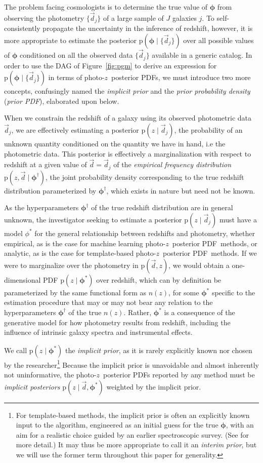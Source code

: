 \documentclass[iop]{emulateapj}
\newcommand{\todo}[3]{{\color{#2}\emph{#1}: #3}}
\newcommand{\que}[1]{\todo{Question}{cyan}{#1}}
\newcommand{\Fig}[1]{Figure~\ref{#1}}
\newcommand{\data}{\ensuremath{\vec{d}}}%
\newcommand{\pr}[1]{\ensuremath{\mathrm{p}(#1)}}%
\newcommand{\gvn}{\mid}%
\newcommand{\pz}{photo-$z$}
\newcommand{\pzpdf}{\pz\ posterior PDF}%
\newcommand{\nz}{$n(z)$}
\newcommand{\bvec}[1]{\ensuremath{\boldsymbol{#1}}}%
\newcommand{\ndphi}{\bvec{\phi}}
\begin{document}
The problem facing cosmologists is to determine the true value of $\ndphi$ from observing the photometry $\{\data_{j}\}$ of a large sample of $J$ galaxies $j$.
To self-consistently propagate the uncertainty in the inference of redshift, however, it is more appropriate to estimate the posterior $\pr{\ndphi \gvn \{\data_{j}\}}$ over all possible values of $\ndphi$ conditioned on all the observed data $\{\data_{j}\}$ available in a generic catalog.
In order to use the DAG of \Fig{fig:pgm} to derive an expression for $\pr{\ndphi \gvn \{\data_{j}\}}$ in terms of \pzpdf s, we must introduce two more concepts, confusingly named the \textit{implicit prior} and the \textit{prior probability density} (\textit{prior PDF}), elaborated upon below.

When we constrain the redshift of a galaxy using its observed photometric data $\data_{j}$, we are effectively estimating a posterior $\pr{z \gvn \data_{j}}$, the probability of an unknown quantity conditioned on the quantity we have in hand, i.e the photometric data.
This posterior is effectively a marginalization with respect to redshift at a given value of $\data = \data_{j}$ of the \textit{empirical frequency distribution} $\pr{z, \data \gvn \ndphi^{\dagger}}$, the joint probability density corresponding to the true redshift distribution parameterized by $\ndphi^{\dagger}$, which exists in nature but need not be known.

As the hyperparameters $\ndphi^{\dagger}$ of the true redshift distribution are in general unknown, the investigator seeking to estimate a posterior $\pr{z \gvn \data_{j}}$ must have a model $\phi^{*}$ for the general relationship between redshifts and photometry, whether empirical, as is the case for machine learning \pzpdf\ methods, or analytic, as is the case for template-based \pzpdf\ methods.
If we were to marginalize over the photometry in $\pr{\data, z}$, we would obtain a one-dimensional PDF $\pr{z \gvn \ndphi^{*}}$ over redshift, which can by definition be parameterized by the same functional form as \nz, for some $\ndphi^{*}$ specific to the estimation procedure that may or may not bear any relation to the hyperparameters $\ndphi^{\dagger}$ of the true \nz.
Rather, $\ndphi^{*}$ is a consequence of the generative model for how photometry results from redshift, including the influence of intrinsic galaxy spectra and instrumental effects. 

We call $\pr{z \gvn \ndphi^{*}}$ the \textit{implicit prior}, as it is rarely explicitly known nor chosen by the researcher\footnote{For template-based methods, the implicit prior is often an explicitly known input to the algorithm, engineered as an initial guess for the true $\ndphi$, with an aim for a realistic choice guided by an earlier spectroscopic survey.  
(See \citet{benitez_bayesian_2000} for more detail.)
It may thus be more appropriate to call it an \textit{interim prior}, but we will use the former term throughout this paper for generality.}
Because the implicit prior is unavoidable and almost inherently not uninformative, the \pzpdf s reported by any method must be \textit{implicit posteriors} ${\pr{z \gvn \data, \ndphi^{*}}}$ weighted by the implicit prior.
\end{document}
